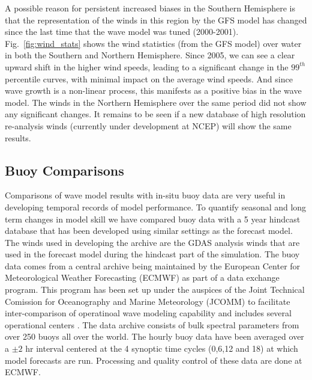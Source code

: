 \documentclass[12pt]{article}
\begin{document}
A possible reason for persistent increased biases in the Southern
Hemisphere is that the representation of the winds in this region by
the GFS model has changed since the last time that the wave model was
tuned (2000-2001). Fig.~\ref{fig:wind_stats} shows the wind statistics
(from the GFS model) over water in both the Southern and Northern
Hemisphere. Since 2005, we can see a clear upward shift in the higher
wind speeds, leading to a significant change in the $99^{th}$
percentile curves, with minimal impact on the average wind speeds. And
since wave growth is a non-linear process, this manifests as a
positive bias in the wave model. The winds in the Northern Hemisphere
over the same period did not show any significant changes. It remains
to be seen if a new database of high resolution re-analysis winds
(currently under development at NCEP) will show the same results.
  
\subsection{Buoy Comparisons}

Comparisons of wave model results with in-situ buoy data are very
useful in developing temporal records of model performance. To
quantify seasonal and long term changes in model skill we have
compared buoy data with a 5 year hindcast database that has been
developed using similar settings as the forecast model. The winds used
in developing the archive are the GDAS analysis winds that are used in
the forecast model during the hindcast part of the simulation. The
buoy data comes from a central archive being maintained by the
European Center for Meteorological Weather Forecasting (ECMWF) as part
of a data exchange program. This program has been set up under the
auspices of the Joint Technical Comission for Oceanography and Marine
Meteorology (JCOMM) to facilitate inter-comparison of operatinoal wave
modeling capability and includes several operational centers
\cite[]{bidlotetal-07}. The data archive consists of bulk spectral
parameters from over 250 buoys all over the
world. The hourly buoy data have been averaged over a $\pm 2$ hr
interval centered at the 4 synoptic time cycles (0,6,12 and 18) at
which model forecasts are run. Processing and quality control of these
data are done at ECMWF. 
\end{document}

